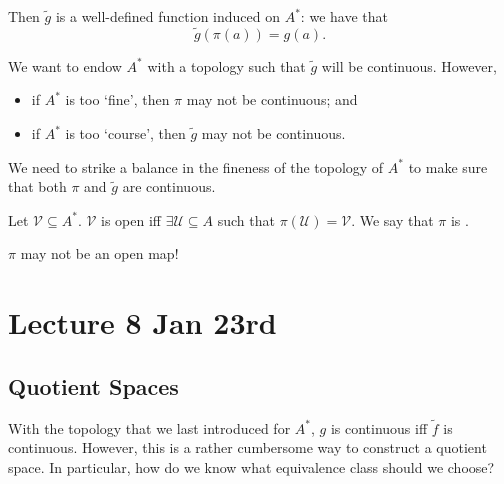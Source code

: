 \documentclass[notoc,notitlepage]{tufte-book}
\begin{document}
Then $\tilde{g}$ is a well-defined function induced on $A^*$: we have that
\begin{equation*}
  \tilde{g}(\pi(a)) = g(a).
\end{equation*}

We want to endow $A^*$ with a topology such that $\tilde{g}$ will be continuous. However,
\begin{itemize}
  \item if $A^*$ is too `fine', then $\pi$ may not be continuous; and
  \item if $A^*$ is too `course', then $\tilde{g}$ may not be continuous.
\end{itemize}
We need to strike a balance in the fineness of the topology of $A^*$ to make sure that both
$\pi$ and $\tilde{g}$ are continuous.

\begin{defn}\label{defn:strongly_continuous}
  Let $\mathcal{V} \subseteq A^*$. $\mathcal{V}$ is open iff $\exists \mathcal{U} \subseteq A$
  such that $\pi(\mathcal{U}) = \mathcal{V}$. We say that $\pi$ is .
\end{defn}

\begin{warning}
  $\pi$ may not be an open map!
\end{warning}




\chapter{Lecture 8 Jan 23rd}%
\label{chp:lecture_8_jan_23rd}

\section{Quotient Spaces}%
\label{sec:quotient_spaces}

With the topology that we last introduced for $A^*$, $g$ is continuous iff $\tilde{f}$ is continuous.
However, this is a rather cumbersome way to construct a quotient space. In particular, how do we know
what equivalence class should we choose?
\end{document}

